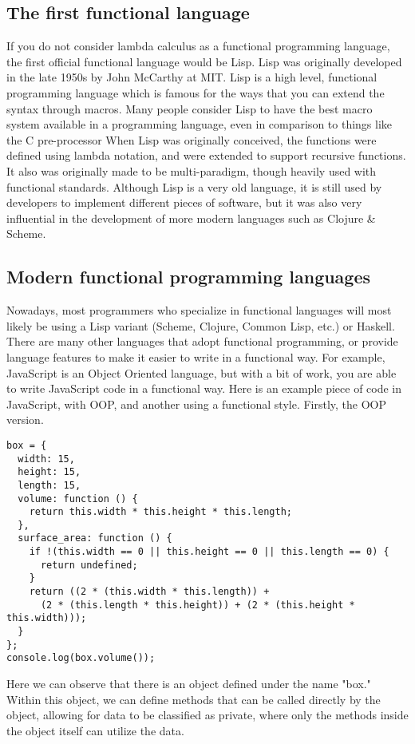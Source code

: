 \documentclass{report}
\begin{document}
\subsection{The first functional language}
If you do not consider lambda calculus as a functional programming language, the first official functional language would be Lisp. Lisp was originally developed in the late 1950s by John McCarthy at MIT. Lisp is a high level, functional programming language which is famous for the ways that you can extend the syntax through macros. Many people consider Lisp to have the best macro system available in a programming language, even in comparison to things like the C pre-processor 
When Lisp was originally conceived, the functions were defined using lambda notation, and were extended to support recursive functions. It also was originally made to be multi-paradigm, though heavily used with functional standards. Although Lisp is a very old language, it is still used by developers to implement different pieces of software, but it was also very influential in the development of more modern languages such as Clojure \& Scheme.
\subsection{Modern functional programming languages}
Nowadays, most programmers who specialize in functional languages will most likely be using a Lisp variant (Scheme, Clojure, Common Lisp, etc.) or Haskell. There are many other languages that adopt functional programming, or provide language features to make it easier to write in a functional way. For example, JavaScript is an Object Oriented language, but with a bit of work, you are able to write JavaScript code in a functional way. Here is an example piece of code in JavaScript, with OOP, and another using a functional style.
Firstly, the OOP version.

\begin{lstlisting}
box = {
  width: 15,
  height: 15,
  length: 15,
  volume: function () {
    return this.width * this.height * this.length;
  },
  surface_area: function () {
    if !(this.width == 0 || this.height == 0 || this.length == 0) {
      return undefined;
    }
    return ((2 * (this.width * this.length)) + 
      (2 * (this.length * this.height)) + (2 * (this.height * this.width)));
  }
};
console.log(box.volume());
\end{lstlisting}

Here we can observe that there is an object defined under the name "box." Within this object, we can define methods that can be called directly by the object, allowing for data to be classified as private, where only the methods inside the object itself can utilize the data.
\end{document}
